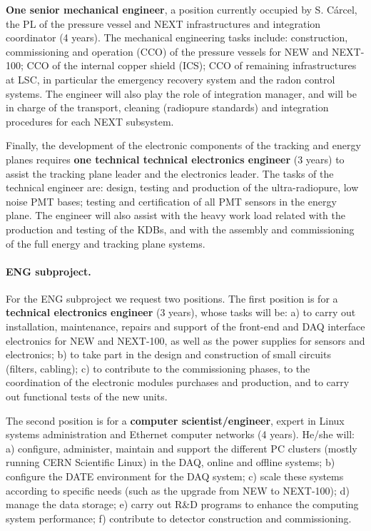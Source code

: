 {\bf One senior mechanical engineer}, a position currently occupied by S. Cárcel, the PL of the pressure vessel and NEXT infrastructures and integration coordinator (4 years). The mechanical engineering tasks include: construction, commissioning and operation (CCO) of the pressure vessels for NEW and NEXT-100; CCO of the internal copper shield (ICS); CCO of remaining infrastructures at LSC, in particular the emergency recovery system and the radon control systems. The engineer will also play the role of integration manager, and will be in charge of the transport, cleaning (radiopure standards) and integration procedures for each NEXT subsystem.

Finally, the development of the electronic components of the tracking and energy planes requires {\bf one technical technical electronics engineer} (3 years) to assist the tracking plane leader and the electronics leader. The tasks of the technical engineer are: design, testing and production of the ultra-radiopure, low noise PMT bases; testing and certification of all PMT sensors in the energy plane. The engineer will also assist with the heavy work load related with the production and testing of the KDBs, and with the assembly and commissioning of the full energy and tracking plane systems.

\paragraph{ENG subproject.}

For the ENG subproject we request two positions. The first position is for a {\bf technical electronics engineer} (3 years), whose tasks will be: a) to carry out installation, maintenance, repairs and support of the front-end and DAQ interface electronics for NEW and NEXT-100, as well as the power supplies for sensors and electronics; b) to take part in the design and construction of small circuits (filters, cabling); c) to contribute to the commissioning phases, to the coordination of the electronic modules purchases and production, and to carry out functional tests of the new units. 

The second position is for a {\bf computer scientist/engineer}, expert in Linux systems administration and Ethernet computer networks (4 years). He/she will: a) configure, administer, maintain and support the different PC clusters (mostly running CERN Scientific Linux) in the DAQ, online and offline systems; b) configure the DATE environment for the DAQ system; c) scale these systems according to specific needs (such as the upgrade from NEW to NEXT-100); d) manage the data storage; e) carry out R\&D programs to enhance the computing system performance; f) contribute to detector construction and commissioning. 

